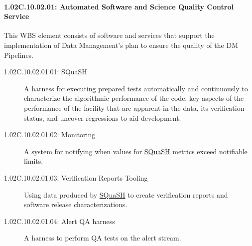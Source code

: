 \paragraph*{1.02C.10.02.01: Automated Software and Science Quality Control Service}
\label{wbs:1.02C.10.02.01}

This WBS element consists of software and services that support the
implementation of Data Management's plan to ensure the quality of the DM
Pipelines.

\begin{description}

\item[1.02C.10.02.01.01: SQuaSH]
  \label{wbs:1.02C.10.02.01.01}
  A harness for executing prepared tests automatically and continuously to
  characterize the algorithmic performance of the code, key aspects of the
  performance of the facility that are apparent in the data, its verification
  status, and uncover regressions to aid development.

\item[1.02C.10.02.01.02: Monitoring]
  A system for notifying when values for
  \hyperref[wbs:1.02C.10.02.01.01]{SQuaSH} metrics exceed notifiable limits.

\item[1.02C.10.02.01.03: Verification Reports Tooling]
  Using data produced by \hyperref[wbs:1.02C.10.02.01.01]{SQuaSH} to create
  verification reports and software release characterizations.

\item[1.02C.10.02.01.04: Alert QA harness]
  A harness to perform QA tests on the alert stream.

\end{description}
